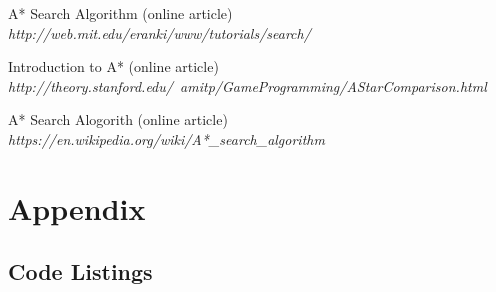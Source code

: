 \documentclass[11pt, a4paper]{article}
\begin{document}
\begin{thebibliography}{}
\par{A* Search Algorithm (online article)}
\\
\textit{http://web.mit.edu/eranki/www/tutorials/search/}



\par{Introduction to A* (online article)}
\\
\textit{http://theory.stanford.edu/~amitp/GameProgramming/AStarComparison.html}



\par{A* Search Alogorith (online article)}
\\
\textit{https://en.wikipedia.org/wiki/A*\_search\_algorithm}




\end{thebibliography}

\newpage
\section*{Appendix}
\subsection{Code Listings}
\label{Code}
















\end{document}
